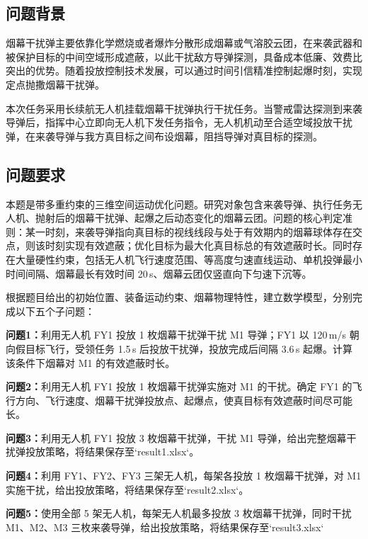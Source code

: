 \documentclass[12pt,a4paper]{article}
\begin{document}
	\subsection{问题背景}
	
	烟幕干扰弹主要依靠化学燃烧或者爆炸分散形成烟幕或气溶胶云团，在来袭武器和被保护目标的中间空域形成遮蔽，以此干扰敌方导弹探测\cite{chen2017}，具备成本低廉、效费比突出的优势。随着投放控制技术发展，可以通过时间引信精准控制起爆时刻，实现定点抛撒烟幕干扰弹。

	本次任务采用长续航无人机挂载烟幕干扰弹执行干扰任务。当警戒雷达探测到来袭导弹后，指挥中心立即向无人机下发任务指令，无人机机动至合适空域投放干扰弹，在来袭导弹与我方真目标之间布设烟幕，阻挡导弹对真目标的探测。
	
	\subsection{问题要求}
	
	本题是带多重约束的三维空间运动优化问题。研究对象包含来袭导弹、执行任务无人机、抛射后的烟幕干扰弹、起爆之后动态变化的烟幕云团。问题的核心判定准则：某一时刻，来袭导弹指向真目标的视线线段与处于有效期内的烟幕球体存在交点，则该时刻实现有效遮蔽；优化目标为最大化真目标总的有效遮蔽时长。同时存在大量硬性约束，包括无人机飞行速度范围、等高度匀速直线运动、单机投弹最小时间间隔、烟幕最长有效时间 20 s、烟幕云团仅竖直向下匀速下沉等。
	
	
	根据题目给出的初始位置、装备运动约束、烟幕物理特性，建立数学模型，分别完成以下五个子问题：
	
	\textbf{问题1：}利用无人机 FY1 投放 1 枚烟幕干扰弹干扰 M1 导弹；FY1 以 120 m/s 朝向假目标飞行，受领任务 1.5 s 后投放干扰弹，投放完成后间隔 3.6 s 起爆。计算该条件下烟幕对 M1 的有效遮蔽时长。
	
	\textbf{问题2：}利用无人机 FY1 投放 1 枚烟幕干扰弹实施对 M1 的干扰。确定 FY1 的飞行方向、飞行速度、烟幕干扰弹投放点、起爆点，使真目标有效遮蔽时间尽可能长。
	
	\textbf{问题3：}利用无人机 FY1 投放 3 枚烟幕干扰弹，干扰 M1 导弹，给出完整烟幕干扰弹投放策略，将结果保存至`result1.xlsx`。
	
	\textbf{问题4：}利用 FY1、FY2、FY3 三架无人机，每架各投放 1 枚烟幕干扰弹，对 M1 实施干扰，给出投放策略，将结果保存至`result2.xlsx`。
	
	\textbf{问题5：}使用全部 5 架无人机，每架无人机最多投放 3 枚烟幕干扰弹，同时干扰 M1、M2、M3 三枚来袭导弹，给出投放策略，将结果保存至`result3.xlsx`
	
	
	
\end{document}
